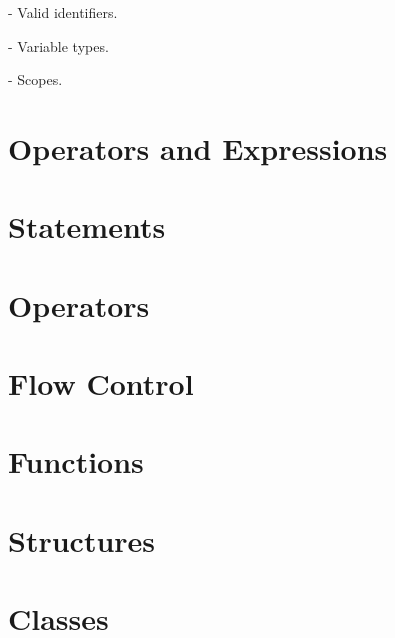 - Valid identifiers.

- Variable types.

- Scopes.

\section{Operators and Expressions}

\section{Statements}
\section{Operators}
\section{Flow Control}
\section{Functions}
\section{Structures}
\section{Classes}


